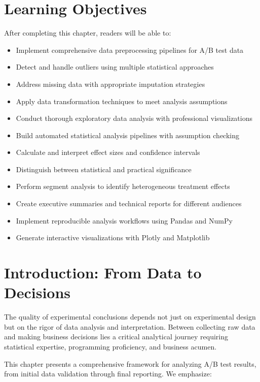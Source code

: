 
\section{Learning Objectives}

After completing this chapter, readers will be able to:
\begin{itemize}
    \item Implement comprehensive data preprocessing pipelines for A/B test data
    \item Detect and handle outliers using multiple statistical approaches
    \item Address missing data with appropriate imputation strategies
    \item Apply data transformation techniques to meet analysis assumptions
    \item Conduct thorough exploratory data analysis with professional visualizations
    \item Build automated statistical analysis pipelines with assumption checking
    \item Calculate and interpret effect sizes and confidence intervals
    \item Distinguish between statistical and practical significance
    \item Perform segment analysis to identify heterogeneous treatment effects
    \item Create executive summaries and technical reports for different audiences
    \item Implement reproducible analysis workflows using Pandas and NumPy
    \item Generate interactive visualizations with Plotly and Matplotlib
\end{itemize}

\section{Introduction: From Data to Decisions}

The quality of experimental conclusions depends not just on experimental design but on the rigor of data analysis and interpretation. Between collecting raw data and making business decisions lies a critical analytical journey requiring statistical expertise, programming proficiency, and business acumen.

This chapter presents a comprehensive framework for analyzing A/B test results, from initial data validation through final reporting. We emphasize:

